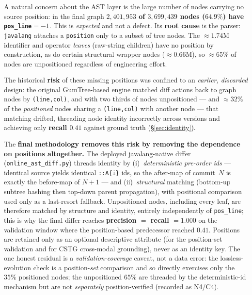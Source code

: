 \documentclass[11pt,a4paper]{article}
\newcommand{\code}[1]{\texttt{#1}}
\begin{document}
	A natural concern about the AST layer is the large number of nodes carrying no
	source position: in the final graph \textbf{$2{,}401{,}953$ of $3{,}699{,}439$
	nodes ($64.9\%$) have \code{pos\_line}$=-1$}. This is \emph{expected} and not a
	defect. Its \textbf{root cause} is the parser: \texttt{javalang} attaches a
	\code{position} only to a subset of tree nodes. The $\approx$$1.74$M identifier and
	operator \emph{leaves} (raw-string children) have no position by construction, as do
	certain structural wrapper nodes ($\approx$$0.66$M), so $\approx\!65\%$ of nodes are
	unpositioned regardless of engineering effort.

	The historical \textbf{risk} of these missing positions was confined to an
	\emph{earlier, discarded} design: the original GumTree-based engine matched diff
	actions back to graph nodes by \code{(line,col)}, and with two thirds of nodes
	unpositioned --- and $\approx$$32\%$ of the \emph{positioned} nodes sharing a
	\code{(line,col)} with another node --- that matching drifted, threading node
	identity incorrectly across versions and achieving only \textbf{recall $0.41$}
	against ground truth (\S\ref{sec:identity}).

	The \textbf{final methodology removes this risk by removing the dependence on
	positions altogether.} The deployed javalang-native differ
	(\code{online\_ast\_diff.py}) threads identity by (i)~\emph{deterministic pre-order
	ids} --- identical source yields identical \texttt{::A\{i\}} ids, so the after-map of
	commit~$N$ is exactly the before-map of $N{+}1$ --- and (ii)~\emph{structural}
	matching (bottom-up subtree hashing then top-down parent propagation), with
	positional comparison used only as a last-resort fallback. Unpositioned nodes,
	including every leaf, are therefore matched by structure and identity, entirely
	independently of \code{pos\_line}; this is why the final differ reaches
	\textbf{precision $=$ recall $=1.000$} on the validation window where the
	position-based predecessor reached $0.41$. Positions are retained only as an
	optional descriptive attribute (for the position-set validation and for CSTG
	cross-modal grounding), never as an identity key. The one honest residual is a
	\emph{validation-coverage} caveat, not a data error: the lossless-evolution check is
	a position-\emph{set} comparison and so directly exercises only the $35\%$ positioned
	nodes; the unpositioned $65\%$ are threaded by the deterministic-id mechanism but are
	not \emph{separately} position-verified (recorded as N4/C4).
	
\end{document}
